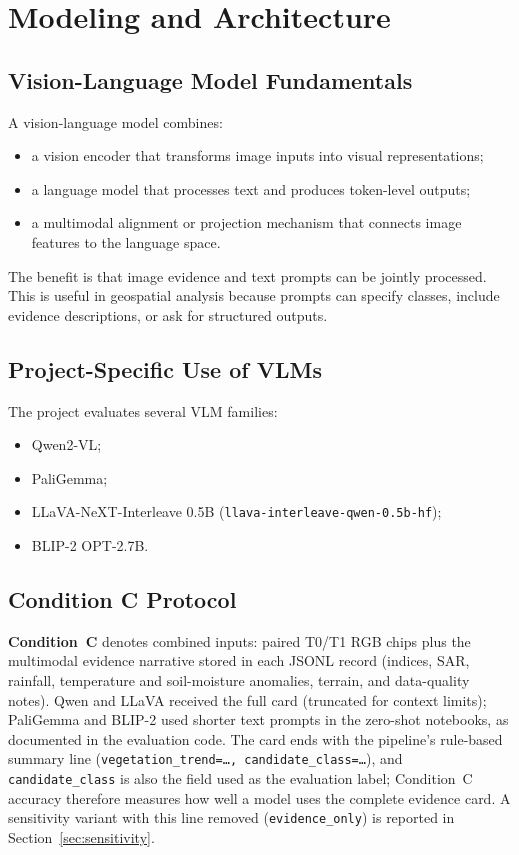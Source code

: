 \documentclass[11pt]{article}
\begin{document}
\section{Modeling and Architecture}

\subsection{Vision-Language Model Fundamentals}
A vision-language model combines:
\begin{itemize}
    \item a vision encoder that transforms image inputs into visual representations;
    \item a language model that processes text and produces token-level outputs;
    \item a multimodal alignment or projection mechanism that connects image features to the language space.
\end{itemize}

The benefit is that image evidence and text prompts can be jointly processed. This is useful in geospatial analysis because prompts can specify classes, include evidence descriptions, or ask for structured outputs.

\subsection{Project-Specific Use of VLMs}
The project evaluates several VLM families:
\begin{itemize}
    \item Qwen2-VL;
    \item PaliGemma;
    \item LLaVA-NeXT-Interleave 0.5B (\texttt{llava-interleave-qwen-0.5b-hf});
    \item BLIP-2 OPT-2.7B.
\end{itemize}

\subsection{Condition C Protocol}
\textbf{Condition~C} denotes combined inputs: paired T0/T1 RGB chips plus the multimodal evidence narrative stored in each JSONL record (indices, SAR, rainfall, temperature and soil-moisture anomalies, terrain, and data-quality notes). Qwen and LLaVA received the full card (truncated for context limits); PaliGemma and BLIP-2 used shorter text prompts in the zero-shot notebooks, as documented in the evaluation code. The card ends with the pipeline's rule-based summary line (\texttt{vegetation\_trend=\dots, candidate\_class=\dots}), and \texttt{candidate\_class} is also the field used as the evaluation label; Condition~C accuracy therefore measures how well a model uses the complete evidence card. A sensitivity variant with this line removed (\texttt{evidence\_only}) is reported in Section~\ref{sec:sensitivity}.
\end{document}
